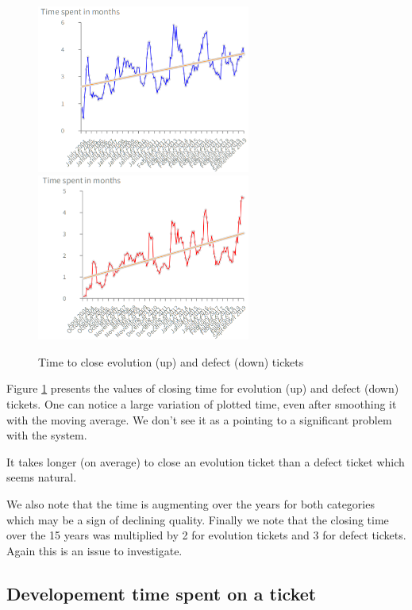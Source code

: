 \documentclass[10pt,conference]{IEEEtran}
\begin{document}
\begin{figure}[htbp]
  \centering
  \includegraphics[width=70mm]{./images/openCloseEvol.png} \\
  \includegraphics[width=70mm]{./images/openCloseBug.png}
  \caption{Time to close evolution (up) and defect (down) tickets}
  \label{fig:closingTime}
\end{figure}

Figure \ref{fig:closingTime} presents the values of closing time for evolution (up) and defect (down) tickets.
One can notice a large variation of plotted time, even after smoothing it with the moving average. 
We don't see it as a pointing to a significant problem with the system.


It takes longer (on average) to close an evolution ticket than a defect ticket which seems natural.

We also note that the time is augmenting over the years for both categories which may be a sign of declining quality.
Finally we note that the closing time over the 15 years was multiplied by 2 for evolution tickets and 3 for defect tickets.
Again this is an issue to investigate.


\subsection{Developement time spent on a ticket}
\end{document}
